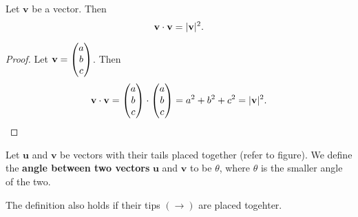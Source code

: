 \documentclass[12pt]{article}
\renewcommand{\vec}{\mathbf}
\begin{document}
\begin{thm}
	Let \(\vec{v}\) be a vector.
	Then 
	\[ \vec{v} \cdot \vec{v} = \abs{\vec{v}}^2. \] 
\end{thm}

\begin{proof}
	Let \(\vec{v} = \cvec{a \\ b \\ c}\). Then
	\[ \vec{v} \cdot \vec{v} = \cvec{a \\ b \\ c} \cdot \cvec{a \\ b \\ c} = a^2 + b^2 + c^2 = \abs{\vec{v}}^2. \] 
\end{proof}

\begin{defn}
	Let \(\vec{u}\) and \(\vec{v}\) be vectors with their tails placed together (refer to figure).
	We define the \textbf{angle between two vectors} \(\vec{u}\) and \(\vec{v}\) to be \(\theta\), where \(\theta\) is the smaller angle of the two.
	\begin{figure}[H]
		\centering
	\end{figure}
	The definition also holds if their tips \((\rightarrow)\) are placed togehter.
\end{defn}
\end{document}
